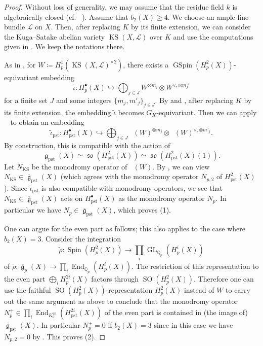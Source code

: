 \documentclass[12pt,reqno]{amsart}
\theoremstyle{definition}
\newcommand{\Q}{{\mathds Q}}
\DeclareMathOperator{\Dpst}{\mathit{D}_{\mathrm{pst}}}
\newcommand\End{\mathop{\mathrm{End}}\nolimits}
\newcommand\GL{\mathop{\mathrm{GL}}\nolimits}
\renewcommand\ge{\mathop{\mathfrak{g}}\nolimits}
\newcommand\so{\mathop{\mathfrak{so}}\nolimits}
\newcommand\Spin{\mathop{\mathrm{Spin}}\nolimits}
\newcommand\GSpin{\mathop{\mathrm{GSpin}}\nolimits}
\newcommand\SO{\mathop{\mathrm{SO}}\nolimits}
\newcommand\KS{\mathop{\mathrm{KS}}\nolimits}
\newcommand{\scrL}{\mathscr{L}}
\DeclareMathOperator{\pst}{pst}
\DeclareMathOperator{\ur}{ur}
\numberwithin{equation}{section}
\begin{document}
\begin{proof}
Without loss of generality, 
we may assume that the residue field $k$ is algebraically closed (cf.~ \cite[\S 5.1.5]{Fontaine94III}).
Assume that $b_2(X) \geq 4$.
We choose an ample line bundle $\scrL$ on $X$.
Then, after replacing $K$ by its finite extension, we can consider the Kuga--Satake abelian variety $\KS(X,\scrL)$ over $K$ and use the computations given in .
We keep the notations there.

As in ,
for $W\coloneqq H^1_{p} (\KS(X,\scrL)^{\times 2})$,
there exists a $\GSpin(H^2_{p}(X))$-equivariant embedding
\[
\widetilde{\iota} \colon  H^\bullet_p(X) \hookrightarrow \bigoplus_{j \in J}W^{\otimes m_j} \otimes W^{\vee,\otimes m_j'}
\]
for a finite set $J$ and some integers $\{m_j, m'_j\}_{j \in J}$.
By
and
,
after replacing $K$ by its finite extension, the embedding $\widetilde{\iota}$ becomes $G_K$-equivariant.
Then we can apply $\Dpst$ to obtain
an embedding
\begin{equation}\label{eqn:pst Kuga Satake embedding for total cohomology}
\widetilde{\iota}_{\pst} \colon H^{\bullet}_{\pst} (X) \hookrightarrow \bigoplus_{j \in J}\Dpst(W)^{\otimes m_j} \otimes \Dpst(W)^{\vee,\otimes m'_j}.
\end{equation}
By construction, this is compatible with the action of
\[
\overline{\ge}_{\pst}(X)\simeq \so(H^2_{\pst}(X)) \simeq \so(H^2_{\pst}(X)(1)).
\]
Let $N_{\KS}$ be the monodromy operator of $\Dpst(W)$.
By , we can view $N_{\KS} \in \overline{\ge}_{\pst}(X)$
(which agrees with the monodromy operator $N_{p,2}$ of $H^2_{\pst}(X)$).
Since 
$\widetilde{\iota}_{\pst}$
is also compatible with monodromy operators,
we see that $N_{\KS} \in \overline{\ge}_{\pst}(X)$ acts on $H^{\bullet}_{\pst} (X)$ as the monodromy operator $N_p$.
In particular we have $N_p \in \overline{\ge}_{\pst}(X)$, which proves (1).

One can argue for the even part as follows; this also applies to the case where $b_2(X)=3$.
Consider the integration
\[
\widetilde{\rho} \colon \Spin(H^2_p(X)) \to \prod_i\GL_{\Q_p}(H^i_p(X))
\]
of $\rho \colon \overline{\ge}_p(X) \to \prod_i\End_{\Q_p}(H^i_p(X))$.
The restriction of this representation to the even part $\bigoplus_i H^{2i}_p(X)$ factors through $\SO(H^2_p(X))$.
Therefore one can use the faithful $\SO(H^2_p(X))$-representation
$H^2_p(X)$ instead of $W$ to carry out the same argument as above to conclude that the monodromy operator
    $N^+_p \in \prod_i \End_{K^{\ur}_0}(H^{2i}_{\pst}(X))$
    of the even part
    is contained in
    (the image of)
    $\overline{\ge}_{\pst}(X)$.
In particular $N^+_p=0$ if $b_2(X)=3$ since in this case we have $N_{p, 2}=0$ by .
This proves (2).
\end{proof}
\end{document}
